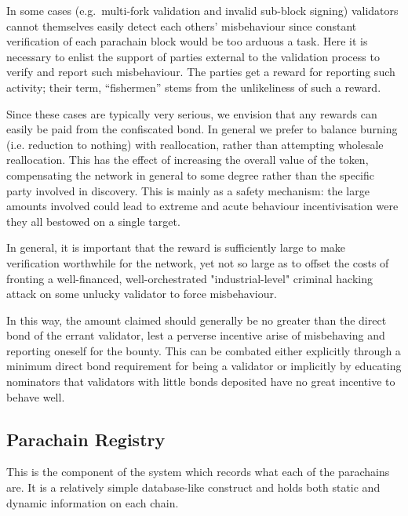 \documentclass[9pt,oneside]{amsart}
\makeatletter
\newcommand*\eg{e.g.\@\xspace}
\newcommand*\ie{i.e.\@\xspace}
\makeatother
\begin{document}
\begin{multicols}{2}
In some cases (\eg~multi-fork validation and invalid sub-block signing) validators cannot themselves easily detect each others' misbehaviour since constant verification of each parachain block would be too arduous a task. Here it is necessary to enlist the support of parties external to the validation process to verify and report such misbehaviour. The parties get a reward for reporting such activity; their term, ``fishermen'' stems from the unlikeliness of such a reward.

 Since these cases are typically very serious, we envision that any rewards can easily be paid from the confiscated bond. In general we prefer to balance burning (\ie reduction to nothing) with reallocation, rather than attempting wholesale reallocation. This has the effect of increasing the overall value of the token, compensating the network in general to some degree rather than the specific party involved in discovery. This is mainly as a safety mechanism: the large amounts involved could lead to extreme and acute behaviour incentivisation were they all bestowed on a single target.

 In general, it is important that the reward is sufficiently large to make verification worthwhile for the network, yet not so large as to offset the costs of fronting a well-financed, well-orchestrated "industrial-level" criminal hacking attack on some unlucky validator to force misbehaviour.

 In this way, the amount claimed should generally be no greater than the direct bond of the errant validator, lest a perverse incentive arise of misbehaving and reporting oneself for the bounty. This can be combated either explicitly through a minimum direct bond requirement for being a validator or implicitly by educating nominators that validators with little bonds deposited have no great incentive to behave well.

\subsection{Parachain Registry}
\label{parachain-registry}

 This is the component of the system which records what each of the parachains are. It is a relatively simple database-like construct and holds both static and dynamic information on each chain.


\end{multicols}
\end{document}
